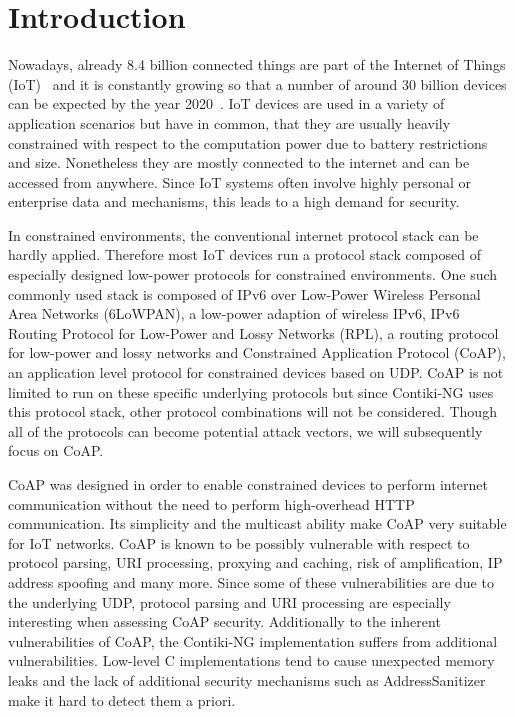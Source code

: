 \section{Introduction}
\label{section:introduction}


Nowadays, already 8.4 billion connected things are part of the Internet of Things (IoT)~\cite{IoTForecastGartner} and it is constantly growing so that a number of around 30 billion devices can be expected by the year 2020~\cite{IoTForecastNordrum}. IoT devices are used in a variety of application scenarios but have in common, that they are usually heavily constrained with respect to the computation power due to battery restrictions and size. Nonetheless they are mostly connected to the internet and can be accessed from anywhere. Since IoT systems often involve highly personal or enterprise data and mechanisms, this leads to a high demand for security. 

In constrained environments, the conventional internet protocol stack can be hardly applied. Therefore most IoT devices run a protocol stack composed of especially designed low-power protocols for constrained environments. One such commonly used stack is composed of IPv6 over Low-Power Wireless Personal Area Networks (6LoWPAN), a low-power adaption of wireless IPv6, IPv6 Routing Protocol for Low-Power and Lossy Networks (RPL), a routing protocol for low-power and lossy networks and Constrained Application Protocol (CoAP), an application level protocol for constrained devices based on UDP. CoAP is not limited to run on these specific underlying protocols but since Contiki-NG uses this protocol stack, other protocol combinations will not be considered. Though all of the protocols can become potential attack vectors, we will subsequently focus on CoAP. 

CoAP was designed in order to enable constrained devices to perform internet communication without the need to perform high-overhead HTTP communication. Its simplicity and the multicast ability make CoAP very suitable for IoT networks.
CoAP is known to be possibly vulnerable with respect to protocol parsing, URI processing, proxying and caching, risk of amplification, IP address spoofing and many more. Since some of these vulnerabilities are due to the underlying UDP, protocol parsing and URI processing are especially interesting when assessing CoAP security. Additionally to the inherent vulnerabilities of CoAP, the Contiki-NG implementation suffers from additional vulnerabilities. Low-level C implementations tend to cause unexpected memory leaks and the lack of additional security mechanisms such as AddressSanitizer make it hard to detect them a priori.

